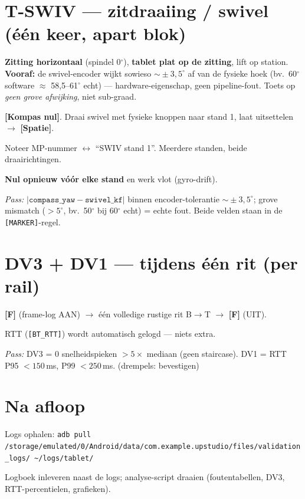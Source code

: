 \documentclass[10pt,a4paper]{article}
\newcommand{\btn}[1]{\textbf{[#1]}}
\newcommand{\pass}[1]{\textit{Pass:} #1}
\begin{document}
\section{T-SWIV — zitdraaiing / swivel (één keer, apart blok)}
\textbf{Zitting horizontaal} (spindel 0$^\circ$), \textbf{tablet plat op de zitting}, lift op station.\\
\textbf{Vooraf:} de swivel-encoder wijkt sowieso $\sim\!\pm3{,}5^\circ$ af van de fysieke hoek (bv.\ 60$^\circ$ software $\approx$ 58{,}5--61$^\circ$ echt) --- hardware-eigenschap, geen pipeline-fout. Toets op \emph{geen grove afwijking}, niet sub-graad.
\begin{cb}
\item \btn{Kompas nul}. Draai swivel met fysieke knoppen naar stand 1, laat uitsettelen $\rightarrow$ \btn{Spatie}.
\item Noteer MP-nummer $\leftrightarrow$ ``SWIV stand 1''. Meerdere standen, beide draairichtingen.
\item \textbf{Nul opnieuw vóór elke stand} en werk vlot (gyro-drift).
\end{cb}
\pass{$|\texttt{compass\_yaw} - \texttt{swivel\_kf}|$ binnen encoder-tolerantie $\sim\!\pm3{,}5^\circ$; grove mismatch ($>5^\circ$, bv.\ 50$^\circ$ bij 60$^\circ$ echt) = echte fout. \footnotesize Beide velden staan in de \texttt{[MARKER]}-regel.}

\section{DV3 + DV1 — tijdens één rit (per rail)}
\begin{cb}
\item \btn{F} (frame-log AAN) $\rightarrow$ één volledige rustige rit B$\rightarrow$T $\rightarrow$ \btn{F} (UIT).
\item RTT (\texttt{[BT\_RTT]}) wordt automatisch gelogd — niets extra.
\end{cb}
\pass{DV3 = 0 snelheidspieken $>5\times$ mediaan (geen staircase). \quad DV1 = RTT P95 $<150$\,ms, P99 $<250$\,ms. \footnotesize(drempels: bevestigen)}

\section{Na afloop}
\begin{cb}
\item Logs ophalen: \texttt{adb pull /storage/emulated/0/Android/data/com.example.upstudio/files/validation\_logs/ \textasciitilde/logs/tablet/}
\item Logboek inleveren naast de logs; analyse-script draaien (foutentabellen, DV3, RTT-percentielen, grafieken).
\end{cb}
\end{document}
